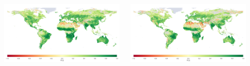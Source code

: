 \documentclass[25pt, a0paper, portrait, innermargin=4cm, colspace=2.5cm]{tikzposter}
\begin{document}
\begin{columns}
{      \begin{minipage}[t]{0.5\blockwidth}
        \begin{center}
          \begin{tikzfigure} 
            \includegraphics[width=0.49\blockwidth]{figures/WARP_SM_ERAINT_R_ALL_map.png}
          \end{tikzfigure}
        \end{center}
      \end{minipage}
      \begin{minipage}[t]{0.5\blockwidth}
        \begin{center}
          \begin{tikzfigure}
            \includegraphics[width=0.49\blockwidth]{figures/WARP_SM_GLDAS_R_ALL_map.png}
          \end{tikzfigure}
        \end{center}
      \end{minipage}
      \begin{minipage}[t]{\blockwidth}
        \begin{tikzfigure}
          \centering
        \end{tikzfigure}
      \end{minipage} 
    }
    

  \end{columns}
\end{document}
